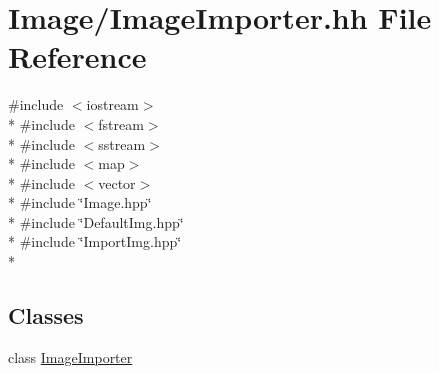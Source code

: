 \hypertarget{ImageImporter_8hh}{\section{Image/\-Image\-Importer.hh File Reference}
\label{ImageImporter_8hh}
}
{\ttfamily \#include $<$iostream$>$}\\*
{\ttfamily \#include $<$fstream$>$}\\*
{\ttfamily \#include $<$sstream$>$}\\*
{\ttfamily \#include $<$map$>$}\\*
{\ttfamily \#include $<$vector$>$}\\*
{\ttfamily \#include \char`\"{}Image.\-hpp\char`\"{}}\\*
{\ttfamily \#include \char`\"{}Default\-Img.\-hpp\char`\"{}}\\*
{\ttfamily \#include \char`\"{}Import\-Img.\-hpp\char`\"{}}\\*
\subsection*{Classes}
\begin{DoxyCompactItemize}
\item 
class \hyperlink{classImageImporter}{Image\-Importer}
\end{DoxyCompactItemize}
